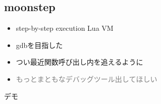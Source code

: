 \subsection{moonstep}
\begin{frame}
	\frametitlesubs
	\begin{itemize}
		\item step-by-step execution Lua VM
		\item gdbを目指した
		\item つい最近関数呼び出し内を追えるように
		\pause \item[] \textcolor{gray}{もっとまともなデバッグツール出してほしい}
	\end{itemize}
\end{frame}
\begin{frame}
	\begin{center}
		\Huge{}デモ
	\end{center}
\end{frame}
